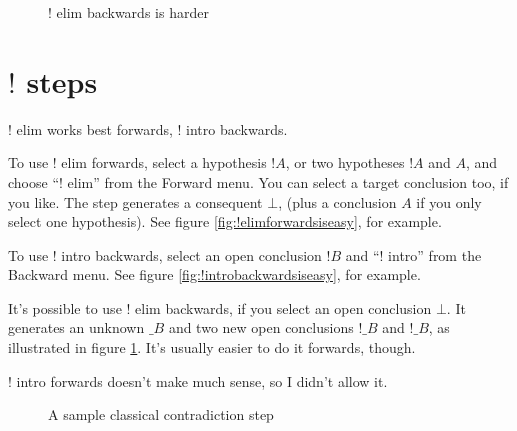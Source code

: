\documentclass[11pt]{book}
\newcommand{\figref}[1]{figure \ref{fig:#1}}
\begin{document}
\begin{figure}
\caption{$!$ elim backwards is harder}
\label{fig:!elimbackwardsisharder}
\end{figure}

\section{$!$ steps}

$!$ elim works best forwards, $!$ intro backwards.

To use $!$ elim forwards, select a hypothesis $!A$, or two hypotheses $!A$ and $A$, and choose ``$!$ elim'' from the Forward menu. You can select a target conclusion too, if you like. The step generates a consequent $\bot$, (plus a conclusion $A$  if you only select one hypothesis). See \figref{!elimforwardsiseasy}, for example.

To use $!$ intro backwards, select an open conclusion $!B$ and ``$!$ intro'' from the Backward menu. See \figref{!introbackwardsiseasy}, for example.

It's possible to use $!$ elim backwards, if you select an open conclusion $\bot$. It generates an unknown $\_B$ and two new open conclusions $!\_B$ and $!\_B$, as illustrated in \figref{!elimbackwardsisharder}. It's usually easier to do it forwards, though.

$!$ intro forwards doesn't make much sense, so I didn't allow it.

\begin{figure}
\centering
{}
\qquad
{}
\caption{A sample classical contradiction step}
\label{fig:classicalcontrastep}
\end{figure}
\end{document}
